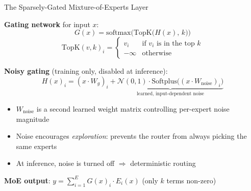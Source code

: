 \begin{frame}{The Sparsely-Gated Mixture-of-Experts Layer}

  \textbf{Gating network} for input $x$:
  \[
    G(x) = \mathrm{softmax}\!\Big(\mathrm{TopK}\big(H(x),\, k\big)\Big)
  \]
  \[
    \mathrm{TopK}(v, k)_i =
    \begin{cases}
      v_i & \text{if } v_i \text{ is in the top } k \\
      -\infty & \text{otherwise}
    \end{cases}
  \]

  \textbf{Noisy gating} (training only, disabled at inference):
  \[
    H(x)_i = (x \cdot W_g)_i + \underbrace{\mathcal{N}(0,1) \cdot \mathrm{Softplus}\!\big((x \cdot W_{\text{noise}})_i\big)}_{\text{learned, input-dependent noise}}
  \]
  \begin{itemize}
    \item $W_{\text{noise}}$ is a second learned weight matrix controlling per-expert noise magnitude
    \item Noise encourages \emph{exploration}: prevents the router from always picking the same experts
    \item At inference, noise is turned off $\Rightarrow$ deterministic routing
  \end{itemize}

  \vspace{0.3em}
  \textbf{MoE output}: $y = \sum_{i=1}^{E} G(x)_i \cdot E_i(x)$ \quad (only $k$ terms non-zero)
\end{frame}


